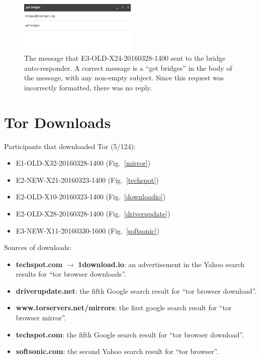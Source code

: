 \documentclass[USenglish,oneside,twocolumn]{article}
\begin{document}
\begin{figure}[h]
\includegraphics[width=0.5\textwidth]{../experiment/processing/failed-participants/20160328-155924-bridgeresponder.png}
\caption{The message that E3-OLD-X24-20160328-1400 sent to the bridge auto-responder. A correct message is a ``get bridges'' in the body of the message, with any non-empty subject. Since this request was incorrectly formatted, there was no reply.}
\label{autoresponder3}
\end{figure} 

\section{Tor Downloads}
\label{tor-downloads}

Participants that downloaded Tor (5/124): 
\begin{itemize}
\item E1-OLD-X32-20160328-1400 (Fig.~\ref{mirror})
\item E2-NEW-X21-20160323-1400 (Fig.~\ref{techspot})
\item E2-OLD-X10-20160323-1400 (Fig.~\ref{downloadio})
\item E2-OLD-X28-20160328-1400 (Fig.~\ref{driverupdate})
\item E3-NEW-X11-20160330-1600 (Fig.~\ref{softsonic})
\end{itemize} 

Sources of downloads: 
\begin{itemize}
\item {\bfseries techspot.com} $\rightarrow$ {\bfseries 1download.io}: an advertisement in the Yahoo search results for ``tor browser downloads''.
\item {\bfseries driverupdate.net}: the fifth Google search result for ``tor browser download''.
\item {\bfseries www.torservers.net/mirrors}: the first google search result for ``tor browser mirror''.
\item {\bfseries techspot.com}: the fifth Google search result for ``tor browser download''.
\item {\bfseries softsonic.com}: the second Yahoo search result for ``tor browser''.
\end{itemize}
\end{document}
